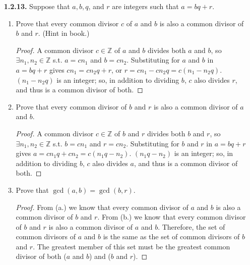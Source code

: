 \documentclass[12pt]{article}
\newcommand{\zee}{\mathbb{Z}}
\begin{document}
\begin{itemize}
\begin{proof}
Since $a|b$ and $b|a$, $\exists n_1, n_2 \in \zee$ s.t. $b = a n_1$ and $a = b n_2$.
Substituting gives $a=a n_1 n_2$.
Because $a$ is nonzero, we can divide through and see that $n_1 n_2 = 1$.
$n_1$ and $n_2$ are integers, so if their product is $1$, then they can only have values ${\pm}1$.
Since $a = b n_2$ and $n_2 = {\pm}1$, it follows that $a = {\pm}b$.
\end{proof}



\item[\textbf{1.2.13.}] Suppose that $a, b, q$, and $r$ are integers such that $a=bq+r$.


\begin{enumerate}[(a.)]
\item Prove that every common divisor $c$ of $a$ and $b$ is also a common divisor of $b$ and $r$.  (Hint in book.)

\begin{proof}
A common divisor $c \in \zee$ of $a$ and $b$ divides both $a$ and $b$, so $\exists n_1, n_2 \in \zee$ s.t. $a = c n_1$ and $b = c n_2$.
Substituting for $a$ and $b$ in $a=bq+r$ gives $c n_1 = c n_2 q + r$, or $r = c n_1 - c n_2 q = c(n_1 - n_2 q)$.
$(n_1 - n_2 q)$ is an integer; so, in addition to dividing $b$, $c$ also divides $r$, and thus is a common divisor of both.
\end{proof}



\item Prove that every common divisor of $b$ and $r$ is also a common divisor of $a$ and $b$.

\begin{proof}
A common divisor $c \in \zee$ of $b$ and $r$ divides both $b$ and $r$, so $\exists n_1, n_2 \in \zee$ s.t. $b = c n_1$ and $r = c n_2$.
Substituting for $b$ and $r$ in $a=bq+r$ gives $a = c n_1 q + c n_2 = c(n_1  q - n_2)$.
$(n_1  q - n_2)$ is an integer; so, in addition to dividing $b$, $c$ also divides $a$, and thus is a common divisor of both.
\end{proof}



\item Prove that $\gcd(a,b)=\gcd(b,r)$.
\begin{proof}
From (a.) we know that every common divisor of $a$ and $b$ is also a common divisor of $b$ and $r$.
From (b.) we know that every common divisor of $b$ and $r$ is also a common divisor of $a$ and $b$.
Therefore, the set of common divisors of $a$ and $b$ is the same as the set of common divisors of $b$ and $r$.
The greatest member of this set must be the greatest common divisor of both ($a$ and $b$) and ($b$ and $r$).
\end{proof}
\end{enumerate}




\end{itemize}
\end{document}
